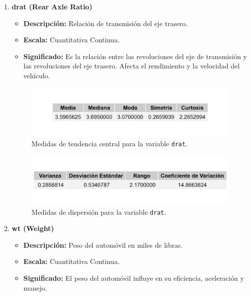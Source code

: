 \documentclass{article}
\begin{document}
\begin{enumerate}
    \item \textbf{drat (Rear Axle Ratio)}

          \begin{itemize}
              \item \textbf{Descripción:} Relación de transmisión del eje trasero.
              \item \textbf{Escala:} Cuantitativa Continua.
              \item \textbf{Significado:} Es la relación entre las revoluciones del eje de transmisión y las revoluciones del eje trasero. Afecta el rendimiento y la velocidad del vehículo.
          \end{itemize}
          
          \begin{figure}[H]
              \centering
              \includegraphics[width=\textwidth]{MTC/drat_central.png}
              \caption{Medidas de tendencia central para la variable \texttt{drat}.}
              \label{fig:drat_central}
          \end{figure}
          
          \begin{figure}[H]
              \centering
              \includegraphics[width=\textwidth]{MTC/drat_dispersion.png}
              \caption{Medidas de dispersión para la variable \texttt{drat}.}
              \label{fig:drat_dispersion}
          \end{figure}

    \item \textbf{wt (Weight)}

          \begin{itemize}
              \item \textbf{Descripción:} Peso del automóvil en miles de libras.
              \item \textbf{Escala:} Cuantitativa Continua.
              \item \textbf{Significado:} El peso del automóvil influye en su eficiencia, aceleración y manejo.
          \end{itemize}
          

\end{enumerate}
\end{document}
